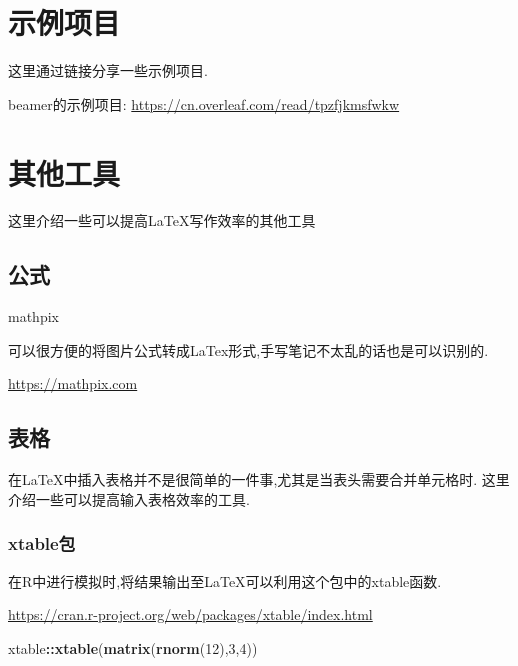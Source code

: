 \documentclass[]{ctexbook}
\newenvironment{Shaded}{\begin{snugshade}}{\end{snugshade}}
\newcommand{\DecValTok}[1]{\textcolor[rgb]{0.00,0.00,0.81}{#1}}
\newcommand{\KeywordTok}[1]{\textcolor[rgb]{0.13,0.29,0.53}{\textbf{#1}}}
\newcommand{\NormalTok}[1]{#1}
\newcommand{\OperatorTok}[1]{\textcolor[rgb]{0.81,0.36,0.00}{\textbf{#1}}}
\begin{document}
\hypertarget{section-15}{%
\chapter{示例项目}\label{section-15}}

这里通过链接分享一些示例项目.

beamer的示例项目:
\url{https://cn.overleaf.com/read/tpzfjkmsfwkw}

\hypertarget{section-16}{%
\chapter{其他工具}\label{section-16}}

这里介绍一些可以提高LaTeX写作效率的其他工具

\hypertarget{section-17}{%
\section{公式}\label{section-17}}

mathpix

可以很方便的将图片公式转成LaTex形式,手写笔记不太乱的话也是可以识别的.

\url{https://mathpix.com}

\hypertarget{section-18}{%
\section{表格}\label{section-18}}

在LaTeX中插入表格并不是很简单的一件事,尤其是当表头需要合并单元格时.
这里介绍一些可以提高输入表格效率的工具.

\hypertarget{xtable}{%
\subsection{xtable包}\label{xtable}}

在R中进行模拟时,将结果输出至LaTeX可以利用这个包中的xtable函数.

\url{https://cran.r-project.org/web/packages/xtable/index.html}

\begin{Shaded}
\begin{Highlighting}[]
\NormalTok{xtable}\OperatorTok{::}\KeywordTok{xtable}\NormalTok{(}\KeywordTok{matrix}\NormalTok{(}\KeywordTok{rnorm}\NormalTok{(}\DecValTok{12}\NormalTok{),}\DecValTok{3}\NormalTok{,}\DecValTok{4}\NormalTok{))}
\end{Highlighting}
\end{Shaded}
\end{document}

